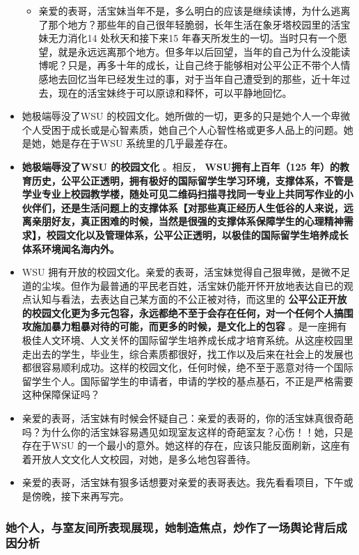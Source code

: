 \documentclass[9pt, b5paper]{article}
\begin{document}
\begin{itemize}
\begin{itemize}
\item 亲爱的表哥，活宝妹当年不是，多么明白的应该是继续读博，为什么逃离了那个地方？那些年的自己很年轻脆弱，长年生活在象牙塔校园里的活宝妹无力消化14 处秋天和接下来15 年春天所发生的一切。当时只有一个愿望，就是永远远离那个地方。但多年以后回望，当年的自己为什么没能读博呢？只是，再多十年的成长，让自己终于能够相对公平公正不带个人情感地去回忆当年已经发生过的事，对于当年自己遭受到的那些，近十年过去，现在的活宝妹终于可以原谅和释怀，可以平静地回忆。
\end{itemize}
\item 她极端辱没了WSU 的校园文化。她所做的一切，更多的只是她个人一个卑微个人受困于成长或是心智素质，她自己个人心智性格或更多人品上的问题。她是她，她是存在于WSU 系统里的几乎最差存在。
\item \textbf{她极端辱没了WSU 的校园文化} 。相反， \textbf{WSU拥有上百年（125 年）的教育历史，公平公正透明，拥有极好的国际留学生学习环境，支撑体系，不管是学业专业上校园教学楼，随处可见二维码扫描寻找同一专业上共同写作业的小伙伴们，还是生活问题上的支撑体系【对那些真正经历人生低谷的人来说，远离亲朋好友，真正困难的时候，当然是很强的支撑体系保障学生的心理精神需求】，校园文化以及管理体系，公平公正透明，以极佳的国际留学生培养成长体系环境闻名海内外。}
\item WSU 拥有开放的校园文化。亲爱的表哥，活宝妹觉得自己狠卑微，是微不足道的尘埃。但作为最普通的平民老百姓，活宝妹仍能开怀开放地表达自已的观点认知与看法，去表达自己某方面的不公正被对待，而这里的 \textbf{公平公正开放的校园文化更为多元包容，永远都绝不至于会存在任何，对一个任何个人搞围攻施加暴力粗暴对待的可能，而更多的时候，是文化上的包容} 。是一座拥有极佳人文环境、人文关怀的国际留学生培养成长成才培育系统。从这座校园里走出去的学生，毕业生，综合素质都很好，找工作以及后来在社会上的发展也都很容易顺利成功。这样的校园文化，任何时候，绝不至于恶意对待一个国际留学生个人。国际留学生的申请者，申请的学校的基点基石，不正是严格需要这种保障保证吗？
\item 亲爱的表哥，活宝妹有时候会怀疑自己：亲爱的表哥的，你的活宝妹真很奇葩吗？为什么你的活宝妹容易遇见如现室友这样的奇葩室友？心伤！！她，只是存在于WSU 的一个最小的意外。她这样的存在，应该只能反面刷新，这座有着开放人文文化人文校园，对她，是多么地包容善待。
\item 亲爱的表哥，活宝妹有狠多话想要对亲爱的表哥表达。我先看看项目，下午或是傍晚，接下来再写完。
\end{itemize}
\subsubsection{她个人，与室友间所表现展现，她制造焦点，炒作了一场舆论背后成因分析}
\label{sec-3-2-3}
\end{document}
